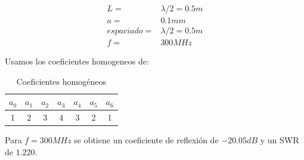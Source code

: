 \documentclass[11pt]{book}
\begin{document}
\begin{align*}
	L = &\lambda/2 =  0.5m \\
	a = & 0.1mm \\
	espaciado = & \lambda / 2 = 0.5m \\
	f = & 300MHz
\end{align*}

Usamos los coeficientes homogeneos de:
\begin{table}[!ht]
	\centering
	\begin{tabular}{c|c|c|c|c|c|c}
		$a_0$ & $a_1$ & $a_2$ & $a_3$ & $a_4$ & $a_5$ & $a_6$ \\ \hline
		1 & 2 & 3 & 4 & 3 & 2 & 1 \\
	\end{tabular}
	\caption{Coeficientes homogéneos}
	\label{tab:2}
\end{table}

\noindent Para $f=300MHz$ se obtiene un coeficiente de reflexión de $-20.05dB$ y un SWR de $1.220$. 
\end{document}
